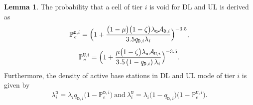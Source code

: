 \documentclass[twocolumn,english]{IEEEtran}
\theoremstyle{plain}
\theoremstyle{definition}
\newtheorem{lemma}{\textbf{Lemma}}
\begin{document}
\begin{lemma}

The probability that a cell of tier $i$ is void for DL and UL is
derived as
\begin{equation}
\mathbb{P}_{\mathit{\mathit{e}}}^{\mathtt{D},i}=\Bigl(1+\frac{\bigl(1-\mu\bigr)\bigl(1-\zeta\bigr)\lambda_{\mathtt{u}}\mathcal{A}_{\mathtt{D},i}}{3.5q_{\mathtt{D},i}\lambda_{i}}\Bigr)^{-3.5},\label{eq:empty_DL}
\end{equation}
\begin{equation}
\mathbb{P}_{\mathit{e}}^{\mathtt{U},i}=\Bigl(1+\frac{\mu\bigl(1-\zeta\bigr)\lambda_{\mathtt{u}}\mathcal{A}_{\mathtt{U},i}}{3.5\left(1-q_{\mathtt{D},i}\right)\lambda_{i}}\Bigr)^{-3.5}.\label{eq:empty_UL}
\end{equation}
Furthermore, the density of active base stations in DL and UL mode
of tier $i$ is given by
\begin{equation}
\lambda_{i}^{\mathtt{D}}=\lambda_{i}q_{\mathtt{D},i}\bigl(1-\mathbb{P}_{e}^{\mathtt{D},i}\bigr)\:\textrm{and}\:\lambda_{i}^{\mathtt{U}}=\lambda_{i}\bigl(1-q_{\mathtt{D},i}\bigr)\bigl(1-\mathbb{P}_{e}^{\mathtt{U},i}\bigr).\label{eq:Density}
\end{equation}


\end{lemma}
\end{document}
